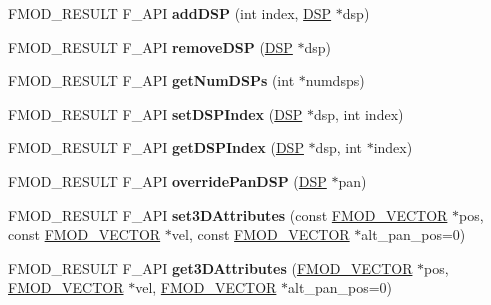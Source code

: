 \begin{DoxyCompactItemize}
F\+M\+O\+D\+\_\+\+R\+E\+S\+U\+LT F\+\_\+\+A\+PI {\bfseries add\+D\+SP} (int index, \hyperlink{classFMOD_1_1DSP}{D\+SP} $\ast$dsp)
\item 
\mbox{\label{classFMOD_1_1ChannelControl_afaad0596454ed0627e98b4fce72bd593}} 
F\+M\+O\+D\+\_\+\+R\+E\+S\+U\+LT F\+\_\+\+A\+PI {\bfseries remove\+D\+SP} (\hyperlink{classFMOD_1_1DSP}{D\+SP} $\ast$dsp)
\item 
\mbox{\label{classFMOD_1_1ChannelControl_a8d818abc62a8839dae3d6dd782b23202}} 
F\+M\+O\+D\+\_\+\+R\+E\+S\+U\+LT F\+\_\+\+A\+PI {\bfseries get\+Num\+D\+S\+Ps} (int $\ast$numdsps)
\item 
\mbox{\label{classFMOD_1_1ChannelControl_a0e667d534c4af622d2afdf5237541c72}} 
F\+M\+O\+D\+\_\+\+R\+E\+S\+U\+LT F\+\_\+\+A\+PI {\bfseries set\+D\+S\+P\+Index} (\hyperlink{classFMOD_1_1DSP}{D\+SP} $\ast$dsp, int index)
\item 
\mbox{\label{classFMOD_1_1ChannelControl_a12ec28e3f98f5c58abc2c5a926572ea2}} 
F\+M\+O\+D\+\_\+\+R\+E\+S\+U\+LT F\+\_\+\+A\+PI {\bfseries get\+D\+S\+P\+Index} (\hyperlink{classFMOD_1_1DSP}{D\+SP} $\ast$dsp, int $\ast$index)
\item 
\mbox{\label{classFMOD_1_1ChannelControl_a45b36878b9ad42fadeb26d606ea79797}} 
F\+M\+O\+D\+\_\+\+R\+E\+S\+U\+LT F\+\_\+\+A\+PI {\bfseries override\+Pan\+D\+SP} (\hyperlink{classFMOD_1_1DSP}{D\+SP} $\ast$pan)
\item 
\mbox{\label{classFMOD_1_1ChannelControl_a8de9f9459a04a145ddd12aac3889058f}} 
F\+M\+O\+D\+\_\+\+R\+E\+S\+U\+LT F\+\_\+\+A\+PI {\bfseries set3\+D\+Attributes} (const \hyperlink{structFMOD__VECTOR}{F\+M\+O\+D\+\_\+\+V\+E\+C\+T\+OR} $\ast$pos, const \hyperlink{structFMOD__VECTOR}{F\+M\+O\+D\+\_\+\+V\+E\+C\+T\+OR} $\ast$vel, const \hyperlink{structFMOD__VECTOR}{F\+M\+O\+D\+\_\+\+V\+E\+C\+T\+OR} $\ast$alt\+\_\+pan\+\_\+pos=0)
\item 
\mbox{\label{classFMOD_1_1ChannelControl_ae889a0ccee9653108836bfaf8b5fcbbd}} 
F\+M\+O\+D\+\_\+\+R\+E\+S\+U\+LT F\+\_\+\+A\+PI {\bfseries get3\+D\+Attributes} (\hyperlink{structFMOD__VECTOR}{F\+M\+O\+D\+\_\+\+V\+E\+C\+T\+OR} $\ast$pos, \hyperlink{structFMOD__VECTOR}{F\+M\+O\+D\+\_\+\+V\+E\+C\+T\+OR} $\ast$vel, \hyperlink{structFMOD__VECTOR}{F\+M\+O\+D\+\_\+\+V\+E\+C\+T\+OR} $\ast$alt\+\_\+pan\+\_\+pos=0)

\end{DoxyCompactItemize}

